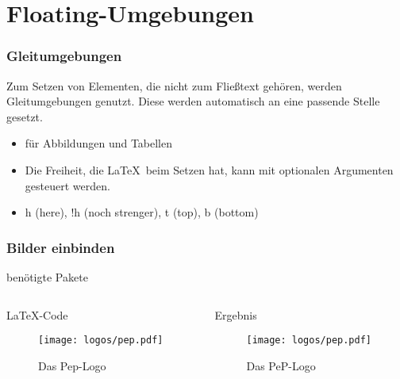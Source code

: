 \section{Floating-Umgebungen}
\begin{frame}
    \frametitle{Gleitumgebungen}
    Zum Setzen von Elementen, die nicht zum Fließtext gehören, werden Gleitumgebungen genutzt. Diese werden automatisch an eine passende Stelle gesetzt.
    \begin{itemize}
        \item für Abbildungen und Tabellen
        \item Die Freiheit, die \LaTeX \ beim Setzen hat, kann mit optionalen Argumenten gesteuert werden.
        \item h  (here), !h (noch strenger), t (top), b (bottom)
    \end{itemize}
\end{frame}
\begin{frame}[fragile]
    \frametitle{Bilder einbinden}
    \begin{block}{benötigte Pakete}
        \begin{lstverbatim}
        \usepackage{graphicx}
        \usepackage[labelfont=bf]{caption}
        \end{lstverbatim}
    \end{block}
    \begin{columns}[T]
        \begin{column}{0.6\textwidth}
            \begin{block}{\LaTeX-Code}
                \begin{lstverbatim}
                \begin{figure}
                    \centering
                    \texttt{[image: logos/pep.pdf]}
                    \caption{Das Pep-Logo}
                    \label{fig:peplogo}
                \end{figure}
                \end{lstverbatim}
            \end{block}
        \end{column}
        \begin{column}{0.35\textwidth}
            \begin{block}{Ergebnis}
                \begin{figure}
                    \centering
                    \texttt{[image: logos/pep.pdf]}
                    \caption{Das PeP-Logo}
                    \label{fig:peplogo}
                \end{figure}
            \end{block}
        \end{column}
    \end{columns}
\end{frame}

